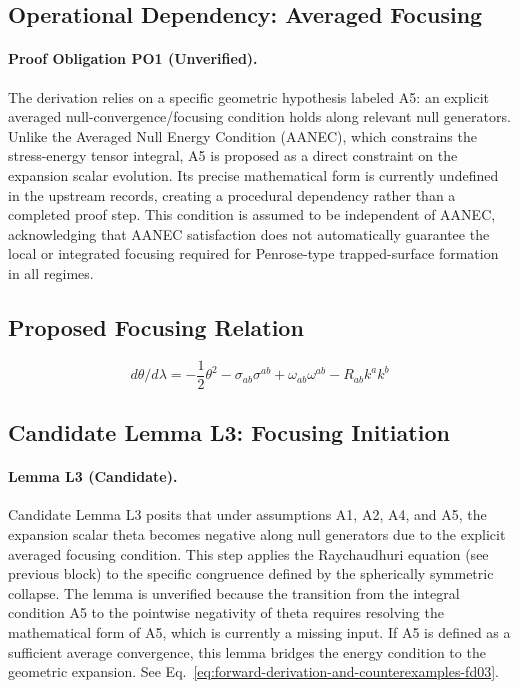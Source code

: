 \documentclass[conference]{IEEEtran}
\begin{document}
\subsection{Operational Dependency: Averaged Focusing}
\paragraph{Proof Obligation PO1 (Unverified).} The derivation relies on a specific geometric hypothesis labeled A5: an explicit averaged null-convergence/focusing condition holds along relevant null generators. Unlike the Averaged Null Energy Condition (AANEC), which constrains the stress-energy tensor integral, A5 is proposed as a direct constraint on the expansion scalar evolution. Its precise mathematical form is currently undefined in the upstream records, creating a procedural dependency rather than a completed proof step. This condition is assumed to be independent of AANEC, acknowledging that AANEC satisfaction does not automatically guarantee the local or integrated focusing required for Penrose-type trapped-surface formation in all regimes.

\subsection{Proposed Focusing Relation}
\begin{equation}
d\theta/d\lambda = -\frac{1}{2}\theta^2 - \sigma_{ab}\sigma^{ab} + \omega_{ab}\omega^{ab} - R_{ab}k^a k^b
\label{eq:forward-derivation-and-counterexamples-fd03}
\end{equation}

\subsection{Candidate Lemma L3: Focusing Initiation}
\paragraph{Lemma L3 (Candidate).} Candidate Lemma L3 posits that under assumptions A1, A2, A4, and A5, the expansion scalar theta becomes negative along null generators due to the explicit averaged focusing condition. This step applies the Raychaudhuri equation (see previous block) to the specific congruence defined by the spherically symmetric collapse. The lemma is unverified because the transition from the integral condition A5 to the pointwise negativity of theta requires resolving the mathematical form of A5, which is currently a missing input. If A5 is defined as a sufficient average convergence, this lemma bridges the energy condition to the geometric expansion. See Eq.~\eqref{eq:forward-derivation-and-counterexamples-fd03}.
\end{document}
